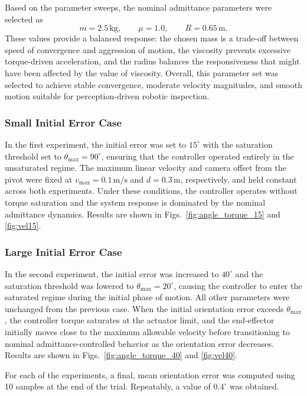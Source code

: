 \documentclass[journal]{IEEEtran}
\begin{document}
Based on the parameter sweeps, the nominal admittance parameters were selected as
\[
m = 2.5\,\mathrm{kg}, \qquad
\mu = 1.0, \qquad
R = 0.65\,\mathrm{m}.
\]
These values provide a balanced response: the chosen mass is a trade-off between speed of convergence and aggression of motion, the viscosity prevents excessive torque-driven acceleration, and the radius balances the responsiveness that might have been affected by the value of viscosity. Overall, this parameter set was selected to achieve stable convergence, moderate velocity magnitudes, and smooth motion suitable for perception-driven robotic inspection.

\subsubsection{Small Initial Error Case}
In the first experiment, the initial error was set to $15^\circ$ with the
saturation threshold set to $\theta_{\max} = 90^\circ$, ensuring that the
controller operated entirely in the unsaturated regime. The maximum linear
velocity and camera offset from the pivot were fixed at
$v_{\max} = 0.1\,\mathrm{m/s}$ and $d = 0.3\,\mathrm{m}$, respectively, and
held constant across both experiments. Under these conditions, the controller
operates without torque saturation and the system response is dominated by the
nominal admittance dynamics. Results are shown in Figs.~\ref{fig:angle_torque_15} and \ref{fig:vel15}.

\subsubsection{Large Initial Error Case}
In the second experiment, the initial error was increased to $40^\circ$ and the
saturation threshold was lowered to $\theta_{\max} = 20^\circ$, causing the
controller to enter the saturated regime during the initial phase of motion.
All other parameters were unchanged from the previous case. When the initial
orientation error exceeds $\theta_{\max}$, the controller torque saturates at
the actuator limit, and the end-effector initially moves close to the maximum
allowable velocity before transitioning to nominal admittance-controlled
behavior as the orientation error decreases. Results are shown in Figs.~\ref{fig:angle_torque_40} and \ref{fig:vel40}.

For each of the experiments, a final, mean orientation error was computed using 10 samples at the end of the trial. Repeatably, a value of $0.4^\circ$ was obtained.
\end{document}
